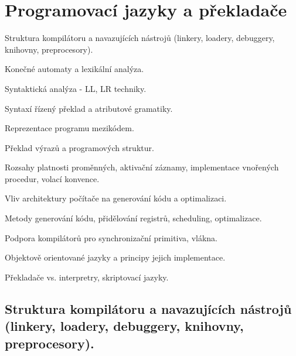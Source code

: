 
\newcommand{\TODO}[1]{\colorbox{orange}{TODO: #1}}
\newcommand{\derives}[1]{\implies \hskip -0.7em ^#1 \hskip 0.7em}







\newpage
\section{Programovací jazyky a překladače}
\begin{pozadavky}
\begin{pitemize}
\item Struktura kompilátoru a navazujících nástrojů (linkery, loadery, debuggery, knihovny, preprocesory).
\item Konečné automaty a lexikální analýza.
\item Syntaktická analýza - LL, LR techniky.
\item Syntaxí řízený překlad a atributové gramatiky.
\item Reprezentace programu mezikódem.
\item Překlad výrazů a programových struktur.
\item Rozsahy platnosti proměnných, aktivační záznamy, implementace vnořených procedur, volací konvence.
\item Vliv architektury počítače na generování kódu a optimalizaci.
\item Metody generování kódu, přidělování registrů, scheduling, optimalizace.
\item Podpora kompilátorů pro synchronizační primitiva, vlákna.
\item Objektově orientované jazyky a principy jejich implementace.
\item Překladače vs. interpretry, skriptovací jazyky.
\end{pitemize}
\end{pozadavky}

\subsection{Struktura kompilátoru a navazujících nástrojů (linkery, loadery, debuggery, knihovny, preprocesory).}

